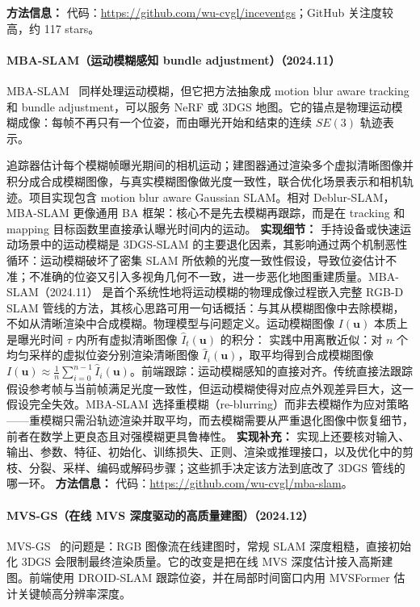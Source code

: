 \textbf{方法信息：} 代码：\url{https://github.com/wu-cvgl/inceventgs}；GitHub 关注度较高，约 117 stars。



\paragraph{MBA-SLAM（运动模糊感知 bundle adjustment）（2024.11）}
MBA-SLAM~\cite{2411_08279} 同样处理运动模糊，但它把方法抽象成 motion blur aware tracking 和 bundle adjustment，可以服务 NeRF 或 3DGS 地图。它的锚点是物理运动模糊成像：每帧不再只有一个位姿，而由曝光开始和结束的连续 $SE(3)$ 轨迹表示。

追踪器估计每个模糊帧曝光期间的相机运动；建图器通过渲染多个虚拟清晰图像并积分成合成模糊图像，与真实模糊图像做光度一致性，联合优化场景表示和相机轨迹。项目实现包含 motion blur aware Gaussian SLAM。相对 Deblur-SLAM，MBA-SLAM 更像通用 BA 框架：核心不是先去模糊再跟踪，而是在 tracking 和 mapping 目标函数里直接承认曝光时间内的运动。
\textbf{实现细节：} 手持设备或快速运动场景中的运动模糊是 3DGS-SLAM 的主要退化因素，其影响通过两个机制恶性循环：运动模糊破坏了密集 SLAM 所依赖的光度一致性假设，导致位姿估计不准；不准确的位姿又引入多视角几何不一致，进一步恶化地图重建质量。MBA-SLAM（2024.11） 是首个系统性地将运动模糊的物理成像过程嵌入完整 RGB-D SLAM 管线的方法，其核心思路可用一句话概括：与其从模糊图像中去除模糊，不如从清晰渲染中合成模糊。物理模型与问题定义。运动模糊图像 $I(\mathbf{u})$ 本质上是曝光时间 $\tau$ 内所有虚拟清晰图像 $\hat{I}_t(\mathbf{u})$ 的积分： 实践中用离散近似：对 $n$ 个均匀采样的虚拟位姿分别渲染清晰图像 $\hat{I}_i(\mathbf{u})$，取平均得到合成模糊图像 $I(\mathbf{u}) \approx \frac{1}{n}\sum_{i=0}^{n-1} \hat{I}_i(\mathbf{u})$。前端跟踪：运动模糊感知的直接对齐。传统直接法跟踪假设参考帧与当前帧满足光度一致性，但运动模糊使得对应点外观差异巨大，这一假设完全失效。MBA-SLAM 选择重模糊（re-blurring）而非去模糊作为应对策略——重模糊只需沿轨迹渲染并取平均，而去模糊需要从严重退化图像中恢复细节，前者在数学上更良态且对强模糊更具鲁棒性。
\textbf{实现补充：} 实现上还要核对输入、输出、参数、特征、初始化、训练损失、正则、渲染或推理接口，以及优化中的剪枝、分裂、采样、编码或解码步骤；这些抓手决定该方法到底改了 3DGS 管线的哪一环。
\textbf{方法信息：} 代码：\url{https://github.com/wu-cvgl/mba-slam}。
\paragraph{MVS-GS（在线 MVS 深度驱动的高质量建图）（2024.12）}
MVS-GS~\cite{2412_19130} 的问题是：RGB 图像流在线建图时，常规 SLAM 深度粗糙，直接初始化 3DGS 会限制最终渲染质量。它的改变是把在线 MVS 深度估计接入高斯建图。前端使用 DROID-SLAM 跟踪位姿，并在局部时间窗口内用 MVSFormer 估计关键帧高分辨率深度。

